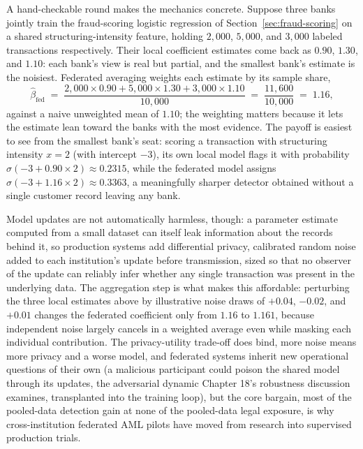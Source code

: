 \documentclass[../ai_in_finance]{subfiles}
\begin{document}
A hand-checkable round makes the mechanics concrete. Suppose three banks jointly train the fraud-scoring logistic regression of Section~\ref{sec:fraud-scoring} on a shared structuring-intensity feature, holding $2{,}000$, $5{,}000$, and $3{,}000$ labeled transactions respectively. Their local coefficient estimates come back as $0.90$, $1.30$, and $1.10$: each bank's view is real but partial, and the smallest bank's estimate is the noisiest. Federated averaging weights each estimate by its sample share,
\begin{equation*}
\hat\beta_{\text{fed}} \;=\; \frac{2{,}000 \times 0.90 + 5{,}000 \times 1.30 + 3{,}000 \times 1.10}{10{,}000} \;=\; \frac{11{,}600}{10{,}000} \;=\; 1.16,
\end{equation*}
against a naive unweighted mean of $1.10$; the weighting matters because it lets the estimate lean toward the banks with the most evidence. The payoff is easiest to see from the smallest bank's seat: scoring a transaction with structuring intensity $x=2$ (with intercept $-3$), its own local model flags it with probability $\sigma(-3 + 0.90 \times 2) \approx 0.2315$, while the federated model assigns $\sigma(-3 + 1.16 \times 2) \approx 0.3363$, a meaningfully sharper detector obtained without a single customer record leaving any bank.

Model updates are not automatically harmless, though: a parameter estimate computed from a small dataset can itself leak information about the records behind it, so production systems add differential privacy, calibrated random noise added to each institution's update before transmission, sized so that no observer of the update can reliably infer whether any single transaction was present in the underlying data. The aggregation step is what makes this affordable: perturbing the three local estimates above by illustrative noise draws of $+0.04$, $-0.02$, and $+0.01$ changes the federated coefficient only from $1.16$ to $1.161$, because independent noise largely cancels in a weighted average even while masking each individual contribution. The privacy-utility trade-off does bind, more noise means more privacy and a worse model, and federated systems inherit new operational questions of their own (a malicious participant could poison the shared model through its updates, the adversarial dynamic Chapter 18's robustness discussion examines, transplanted into the training loop), but the core bargain, most of the pooled-data detection gain at none of the pooled-data legal exposure, is why cross-institution federated AML pilots have moved from research into supervised production trials.
\end{document}
